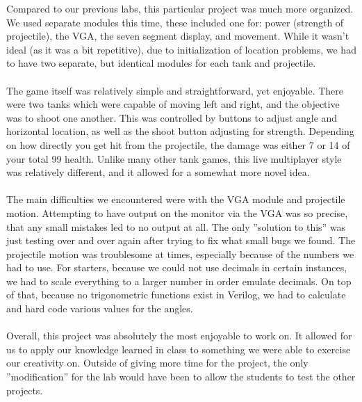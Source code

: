 \documentclass{article}
\begin{document}
Compared to our previous labs, this particular project was much more organized.  We used separate modules this time, these included one for: power (strength of projectile), the VGA, the seven segment display, and movement.  While it wasn't ideal (as it was a bit repetitive), due to initialization of location problems, we had to have two separate, but identical modules for each tank and projectile.  
\\
\\
The game itself was relatively simple and straightforward, yet enjoyable.  There were two tanks which were capable of moving left and right, and the objective was to shoot one another.  This was controlled by buttons to adjust angle and horizontal location, as well as the shoot button adjusting for strength.  Depending on how directly you get hit from the projectile, the damage was either 7 or 14 of your total 99 health.  Unlike many other tank games, this live multiplayer style was relatively different, and it allowed for a somewhat more novel idea. 
\\
\\
The main difficulties we encountered were with the VGA module and projectile motion.  Attempting to have output on the monitor via the VGA was so precise, that any small mistakes led to no output at all.  The only ''solution to this'' was just testing over and over again after trying to fix what small bugs we found.  The projectile motion was troublesome at times, especially because of the numbers we had to use. For starters, because we could not use decimals in certain instances, we had to scale everything to a larger number in order emulate decimals.  On top of that, because no trigonometric functions exist in Verilog, we had to calculate and hard code various values for the angles.
\\
\\
Overall, this project was absolutely the most enjoyable to work on.  It allowed for us to apply our knowledge learned in class to something we were able to exercise our creativity on.  Outside of giving more time for the project, the only ''modification'' for the lab would have been to allow the students to test the other projects.  





%

%

\end{document}
